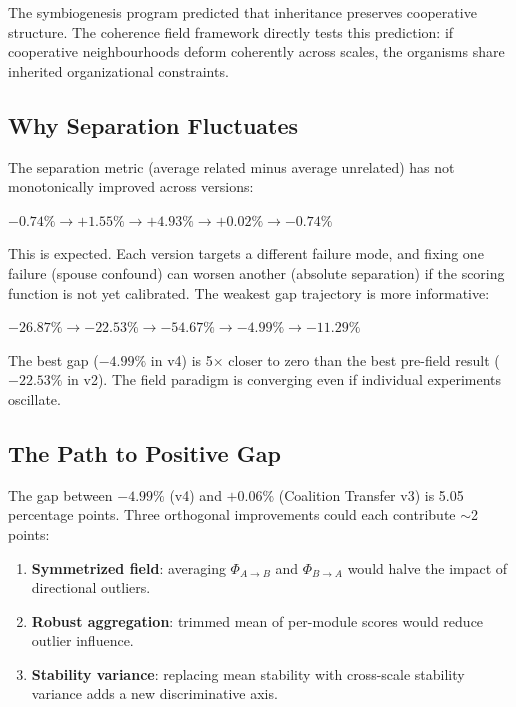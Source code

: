 \documentclass{../yalumba}
\begin{document}
The symbiogenesis program predicted that inheritance preserves cooperative
structure.  The coherence field framework directly tests this prediction:
if cooperative neighbourhoods deform coherently across scales, the organisms
share inherited organizational constraints.

\subsection{Why Separation Fluctuates}

The separation metric (average related minus average unrelated) has not
monotonically improved across versions:

\begin{center}
$-0.74\% \to +1.55\% \to +4.93\% \to +0.02\% \to -0.74\%$
\end{center}

This is expected.  Each version targets a different failure mode, and fixing
one failure (spouse confound) can worsen another (absolute separation) if the
scoring function is not yet calibrated.  The weakest gap trajectory is more
informative:

\begin{center}
$-26.87\% \to -22.53\% \to -54.67\% \to -4.99\% \to -11.29\%$
\end{center}

The best gap ($-4.99\%$ in v4) is 5$\times$ closer to zero than the
best pre-field result ($-22.53\%$ in v2).  The field paradigm is converging
even if individual experiments oscillate.

\subsection{The Path to Positive Gap}

The gap between $-4.99\%$ (v4) and $+0.06\%$ (Coalition Transfer v3) is
5.05 percentage points.  Three orthogonal improvements could each contribute
$\sim$2 points:

\begin{enumerate}
  \item \textbf{Symmetrized field}: averaging $\Phi_{A \to B}$ and
    $\Phi_{B \to A}$ would halve the impact of directional outliers.
  \item \textbf{Robust aggregation}: trimmed mean of per-module scores
    would reduce outlier influence.
  \item \textbf{Stability variance}: replacing mean stability with
    cross-scale stability variance adds a new discriminative axis.
\end{enumerate}
\end{document}
